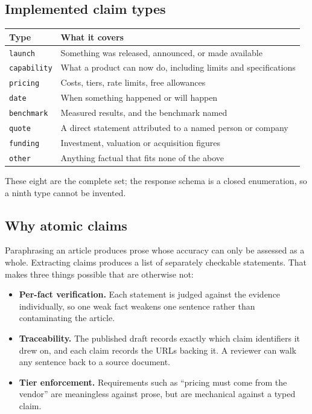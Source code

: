 \documentclass[11pt,a4paper]{article}
\newcommand{\brk}{\hyphenpenalty=0\exhyphenpenalty=0\relax}
\newcommand{\code}[1]{\texttt{\small\brk #1}}
\begin{document}
\subsection{Implemented claim types}

\begin{center}
\small
\begin{tabularx}{\textwidth}{@{}l >{\RaggedRight}X@{}}
\toprule
\textbf{Type} & \textbf{What it covers} \\
\midrule
\code{launch} & Something was released, announced, or made available \\
\code{capability} & What a product can now do, including limits and specifications \\
\code{pricing} & Costs, tiers, rate limits, free allowances \\
\code{date} & When something happened or will happen \\
\code{benchmark} & Measured results, and the benchmark named \\
\code{quote} & A direct statement attributed to a named person or company \\
\code{funding} & Investment, valuation or acquisition figures \\
\code{other} & Anything factual that fits none of the above \\
\bottomrule
\end{tabularx}
\end{center}

These eight are the complete set; the response schema is a closed enumeration, so
a ninth type cannot be invented.

\subsection{Why atomic claims}

\begin{infobox}
Paraphrasing an article produces prose whose accuracy can only be assessed as a
whole. Extracting claims produces a list of separately checkable statements. That
makes three things possible that are otherwise not:
\begin{itemize}[leftmargin=1.2em,itemsep=0.15em,topsep=0.3em]
  \item \textbf{Per-fact verification.} Each statement is judged against the
    evidence individually, so one weak fact weakens one sentence rather than
    contaminating the article.
  \item \textbf{Traceability.} The published draft records exactly which claim
    identifiers it drew on, and each claim records the URLs backing it. A
    reviewer can walk any sentence back to a source document.
  \item \textbf{Tier enforcement.} Requirements such as ``pricing must come from
    the vendor'' are meaningless against prose, but are mechanical against a
    typed claim.
\end{itemize}
\end{infobox}
\end{document}
